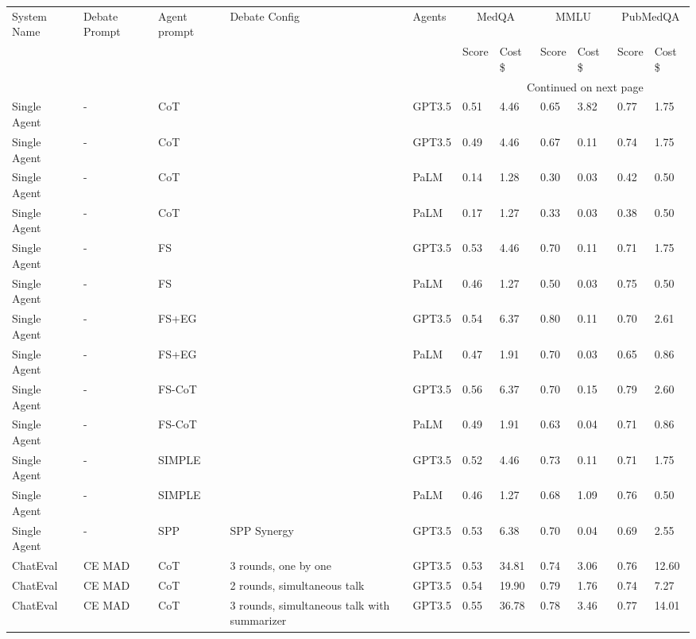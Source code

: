 \small
\begin{landscape}

\begin{longtable}{lllllllllll}
\toprule

System Name & Debate Prompt & Agent prompt & Debate Config & Agents &
\multicolumn{2}{c}{MedQA} & \multicolumn{2}{c}{MMLU} & \multicolumn{2}{c}{PubMedQA} \\
 &   &    &    &   & Score & Cost \$ & Score & Cost \$ & Score & Cost \$ \\
\midrule
\endhead
\midrule
\multicolumn{10}{r}{Continued on next page} \\
\midrule
\endfoot
\bottomrule
\endlastfoot
Single Agent & - & CoT &  & GPT3.5 & 0.51 & 4.46 & 0.65 & 3.82 & 0.77 & 1.75 \\
Single Agent & - & CoT &  & GPT3.5 & 0.49 & 4.46 & 0.67 & 0.11 & 0.74 & 1.75 \\
Single Agent & - & CoT &  & PaLM & 0.14 & 1.28 & 0.30 & 0.03 & 0.42 & 0.50 \\
Single Agent & - & CoT &  & PaLM & 0.17 & 1.27 & 0.33 & 0.03 & 0.38 & 0.50 \\
Single Agent & - & FS &  & GPT3.5 & 0.53 & 4.46 & 0.70 & 0.11 & 0.71 & 1.75 \\
Single Agent & - & FS &  & PaLM & 0.46 & 1.27 & 0.50 & 0.03 & 0.75 & 0.50 \\
Single Agent & - & FS+EG &  & GPT3.5 & 0.54 & 6.37 & 0.80 & 0.11 & 0.70 & 2.61 \\
Single Agent & - & FS+EG &  & PaLM & 0.47 & 1.91 & 0.70 & 0.03 & 0.65 & 0.86 \\
Single Agent & - & FS-CoT &  & GPT3.5 & 0.56 & 6.37 & 0.70 & 0.15 & 0.79 & 2.60 \\
Single Agent & - & FS-CoT &  & PaLM & 0.49 & 1.91 & 0.63 & 0.04 & 0.71 & 0.86 \\
Single Agent & - & SIMPLE &  & GPT3.5 & 0.52 & 4.46 & 0.73 & 0.11 & 0.71 & 1.75 \\
Single Agent & - & SIMPLE &  & PaLM & 0.46 & 1.27 & 0.68 & 1.09 & 0.76 & 0.50 \\
Single Agent & - & SPP & SPP Synergy & GPT3.5 & 0.53 & 6.38 & 0.70 & 0.04 & 0.69 & 2.55 \\
ChatEval & CE MAD & CoT & 3 rounds, one by one & GPT3.5 & 0.53 & 34.81 & 0.74 & 3.06 & 0.76 & 12.60 \\
ChatEval & CE MAD & CoT & 2 rounds, simultaneous talk & GPT3.5 & 0.54 & 19.90 & 0.79 & 1.76 & 0.74 & 7.27 \\
ChatEval & CE MAD & CoT & 3 rounds, simultaneous talk with summarizer & GPT3.5 & 0.55 & 36.78 & 0.78 & 3.46 & 0.77 & 14.01 \\

\end{longtable}
\end{landscape}
